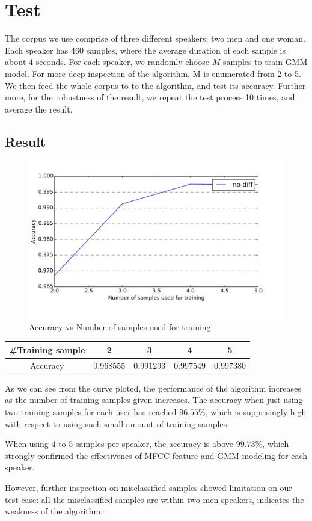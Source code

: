 \section{Test}
The corpus we use comprise of three different speakers: two men and one woman.
Each speaker has 460 samples, where the average duration of each sample is
about 4 seconds.  For each speaker, we randomly choose $M$ samples to train GMM
model. For more deep inspection of the algorithm, M is enumerated from 2 to 5.
We then feed the whole corpus to to the algorithm, and test its accuracy.
Further more, for the robustness of the result, we repeat the test process 10
times, and average the result.

\subsection{Result}
\begin{figure}[!ht]
\centering
\includegraphics[width=\textwidth]{res/plot.pdf}
\caption{Accuracy vs Number of samples used for training}
\label{fig:result}
\end{figure}

\begin{table}[!ht]
	\centering
	\begin{tabular}{|c|c|c|c|c|}
		\hline
        \#Training sample & 2 & 3 & 4 & 5 \\\hline
		Accuracy & 0.968555 & 0.991293 & 0.997549 & 0.997380 \\\hline
	\end{tabular}
	\label{table:result}
\end{table}

As we can see from the curve ploted, the performance of the algorithm increases as
the number of training samples given increases. The accuracy when
just using two training samples for each user has reached $96.55\%$, which
is supprisingly high with respect to using such small amount of training samples.

When using 4 to 5 samples per speaker, the accuracy is above $99.73\%$, which
strongly confirmed the effectivenes of MFCC feature and GMM modeling for each
speaker.

However, further inspection on misclassified samples showed limitation on our
test case: all the misclassified samples are within two men speakers, indicates
the weakness of the algorithm.
